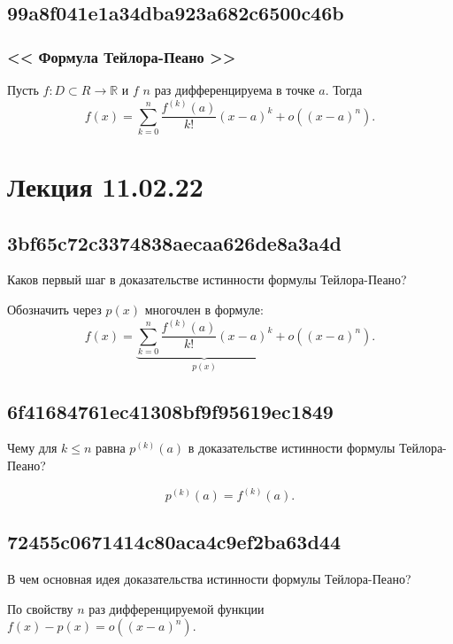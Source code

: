 \documentclass[11pt, a5paper]{article}
\let\oldsection\section
\renewcommand\section{\pagebreak\oldsection}
\newenvironment{note}[1]{\goodbreak\par\subsection{\hfill \color{lightgray}\tiny #1}}{}
\newenvironment{cloze}[2][\ldots]{\begin{leftbar}}{\end{leftbar}}
\newenvironment{icloze}[2][\ldots]{%
  \ignorespaces\text{\tiny \color{lightgray}\{#2} %
}{%
  \text{\tiny\color{lightgray}\}}\unskip%
}
\begin{document}
\begin{note}{99a8f041e1a34dba923a682c6500c46b}
    \subsubsection{<<\begin{icloze}{3}Формула Тейлора-Пеано\end{icloze}>>}

    Пусть \begin{icloze}{2}\( f : D \subset R \to \mathbb R \) и \( f \) \( n \) раз дифференцируема в точке \( a. \)  \end{icloze}
    Тогда \begin{icloze}{1}\[
        f(x) = \sum_{k=0}^{n} \frac{f^{(k)} (a)}{k!} (x - a)^{k} + o((x - a)^{n} ).
    \]\end{icloze}
\end{note}

\section{Лекция 11.02.22}
\begin{note}{3bf65c72c3374838aecaa626de8a3a4d}
    Каков первый шаг в доказательстве истинности формулы Тейлора-Пеано?

    \begin{cloze}{1}
        Обозначить через \( p(x) \) многочлен в формуле:
        \[
            f(x) = \underbrace{\sum_{k=0}^{n} \frac{f^{(k)} (a)}{k!} (x - a)^{k}}_{p(x)}  + o((x - a)^{n} ).
        \]
    \end{cloze}
\end{note}

\begin{note}{6f41684761ec41308bf9f95619ec1849}
    Чему для \( k \leqslant n \) равна \( p^{(k)} (a) \) в доказательстве истинности формулы Тейлора-Пеано?

    \begin{cloze}{1}
        \[
            p^{(k)} (a) = f^{(k)} (a).
        \]
    \end{cloze}
\end{note}

\begin{note}{72455c0671414c80aca4c9ef2ba63d44}
    В чем основная идея доказательства истинности формулы Тейлора-Пеано?

    \begin{cloze}{1}
        По свойству \( n \) раз дифференцируемой функции \( f(x) - p(x) = o((x - a)^{n} )\).
    \end{cloze}
\end{note}
\end{document}
